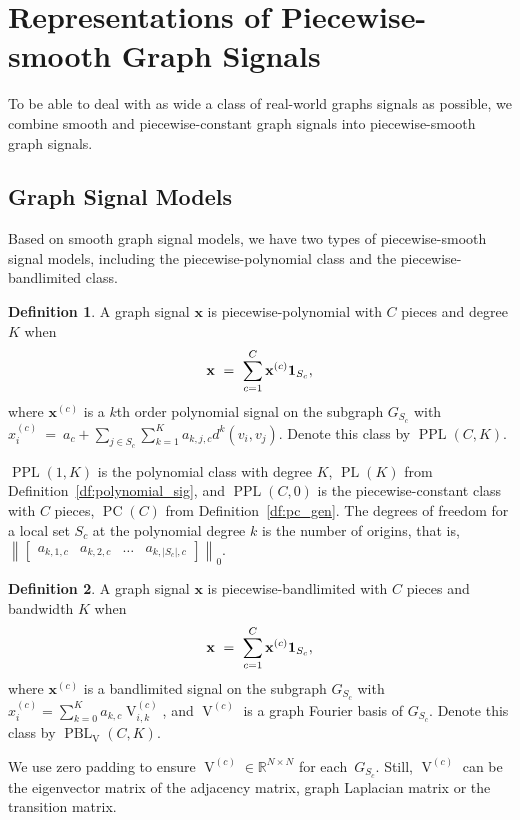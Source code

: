 \documentclass[journal,twocolumn,10pt]{IEEEtran}
\theoremstyle{definition}
\newtheorem{defn}{Definition}
\newcommand{\R}{\ensuremath{\mathbb{R}}}
\def\x{\mathbf{x}}
\DeclareMathOperator{\PL}{PL}
\DeclareMathOperator{\PC}{PC}
\DeclareMathOperator{\PPL}{PPL}
\DeclareMathOperator{\PBL}{PBL}
\DeclareMathOperator{\Vm}{V}
\begin{document}
\section{Representations of Piecewise-smooth Graph Signals}
\label{sec:R_PS}
To be able to deal with as wide a class of real-world graphs signals as possible, we combine smooth and piecewise-constant graph signals into piecewise-smooth graph signals.

\subsection{Graph Signal Models}
Based on smooth graph signal models, we have two types of piecewise-smooth signal models, including the piecewise-polynomial class and the piecewise-bandlimited class.

\begin{defn}
A graph signal $\x$ is piecewise-polynomial with $C$ pieces and degree $K$ when
\begin{equation*}
	\x \ = \  \sum_{c=1}^C  \x^{(c)}  {\bf 1}_{ S_c},
\end{equation*}
where $\x^{(c)}$ is a $k$th order polynomial signal on the subgraph $G_{S_c}$ with $x^{(c)}_i  \ = \   a_{c} + \sum_{j \in S_c} \sum_{k=1}^K a_{k, j, c} d^k(v_i, v_j). $
Denote this class by $\PPL(C, K)$. 
\end{defn}
\noindent $\PPL(1, K)$ is the polynomial class with degree $K$, $\PL(K)$ from Definition~\ref{df:polynomial_sig}, and $\PPL(C, 0)$ is the piecewise-constant class with $C$ pieces, $\PC(C)$ from Definition~\ref{df:pc_gen}. The degrees of freedom for a local set $S_c$ at the polynomial degree $k$ is the number of origins, that is,
$
\left\| \begin{bmatrix}
a_{k, 1, c} & a_{k, 2, c} &  \ldots & a_{k, |S_c|, c}
\end{bmatrix} \right\|_0.$

\begin{defn}
A graph signal $\x$ is piecewise-bandlimited with $C$ pieces and bandwidth $K$ when
\begin{equation*}
	\x \ = \  \sum_{c=1}^C  \x^{(c)}  {\bf 1}_{ S_c},
\end{equation*}
where $\x^{(c)}$ is a bandlimited signal on the subgraph $G_{S_c}$ with $x^{(c)}_i = \sum_{k=0}^K a_{k, c} \Vm^{(c)}_{i,k}$, and $\Vm^{(c)}$ is a graph Fourier basis of $G_{S_c}$.
Denote this class by $\PBL_{\Vm}(C, K)$. 
\end{defn}
\noindent We use zero padding to ensure $\Vm^{(c)} \in \R^{N \times N}$ for each~$G_{S_c}$. Still, $\Vm^{(c)}$ can be the eigenvector matrix of  the adjacency matrix, graph Laplacian matrix or the transition matrix.
\end{document}
